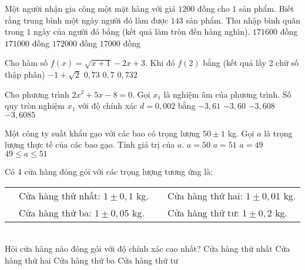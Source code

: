 \begin{ex}%
	Một người nhận gia công một mặt hàng với giá $1200$ đồng cho $1$ sản phẩm. Biết rằng trung bình một ngày người đó làm được $143$ sản phẩm. Thu nhập bình quân trong $1$ ngày của người đó bằng (kết quả làm tròn đến hàng nghìn).
	\choice
	{$171600$ đồng}
	{$171000$ đồng}
	{\True $172000$ đồng}
	{$17000$ đồng}
\end{ex}

\begin{ex}%
	Cho hàm số $f(x)=\sqrt{x+1}-2x+3$. Khi đó $f(2)$ bằng (kết quả lấy 2 chữ số thập phân)
	\choice
	{$-1+\sqrt{2} $}
	{\True $0,73 $}
	{$0,7 $}
	{$0,732 $}
\end{ex}

\begin{ex}%
	Cho phương trình $2x^2+5x-8=0$. Gọi $x_1$ là nghiệm âm của phương trình. Số quy tròn nghiệm $x_1$ với độ chính xác $d=0,002$ bằng
	\choice
	{\True $-3,61 $}
	{$-3,60 $}
	{$-3,608 $}
	{$-3,6085 $}
\end{ex}

\begin{ex}%
	Một công ty suất khẩu gạo với các bao có trọng lượng $50\pm 1$ kg. Gọi $a$ là  trọng lượng thực tế của các bao gạo. Tính giá trị của $a$.
	\choice
	{$a=50$}
	{$a=51$}
	{$a=49$}
	{\True $49\le a \le 51$}
\end{ex}

\begin{ex}%
	Có 4 cửa hàng đóng gói  với các trọng lượng tương ứng là:\\
	\begin{tabular}{m{1cm}m{6cm}m{3cm}l}
		&Cửa hàng thứ nhất: $1\pm 0,1$ kg.&&Cửa hàng thứ hai: $1\pm 0,01$ kg.\\
		&Cửa hàng thứ ba: $1\pm 0,05$ kg.&&Cửa hàng thứ tư: $1\pm 0,2$ kg.\\
	\end{tabular}\\
	Hỏi cửa hàng nào đóng gói với độ chính xác cao nhất?
	\choice
	{Cửa hàng thứ nhất}
	{\True Cửa hàng thứ hai}
	{Cửa hàng thứ ba}
	{Cửa hàng thứ tư}
\end{ex}

